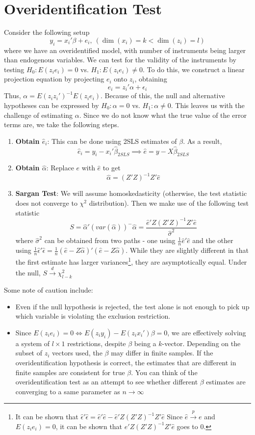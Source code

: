\section{Overidentification Test}
Consider the following setup
\[
y_i = x_i'\beta+e_i, \ (\dim(x_i)=k<\dim(z_i)=l) 
\]
where we have an overidentified model, with number of instruments being larger than endogenous variables. We can test for the validity of the instruments by testing $H_0: E(z_ie_i)=0$ vs. $H_1: E(z_ie_i)\neq0$. To do this, we construct a linear projection equation by projecting $e_i$ onto $z_i$, obtaining
\[
e_i=z_i'\alpha+\epsilon_i
\]
Thus, $\alpha=E(z_iz_i')^{-1}E(z_ie_i)$. Because of this, the null and alternative hypotheses can be expressed by $H_0: \alpha=0$ vs. $H_1: \alpha\neq0$. This leaves us with the challenge of estimating $\alpha$.  Since we do not know what the true value of the error terms are, we take the following steps.
\begin{enumerate}
\item \textbf{Obtain $\hat{e}_i$}: This can be done using 2SLS estimates of $\beta$. As a result, 
\[
\hat{e}_i = y_i-x_i'\hat{\beta}_{2SLS} \implies \hat{e}=y-X\hat{\beta}_{2SLS}
\]
\item \textbf{Obtain $\hat{\alpha}$}: Replace $e$ with $\hat{e}$ to get
\[
\hat{\alpha} = (Z'Z)^{-1}Z'\hat{e}
\]
\item \textbf{Sargan Test}: We will assume homoskedasticity (otherwise, the test statistic does not converge to $\chi^2$ distribution). Then we make use of the following test statistic
\[
S=\hat{\alpha}'(var(\hat{\alpha}))^{-}\hat{\alpha}=\frac{\hat{e}'Z(Z'Z)^{-1}Z'\hat{e}}{\hat{\sigma}^2}
\]
where $\hat{\sigma}^2$ can be obtained from two paths - one using $\frac{1}{n}\hat{e}'\hat{e}$ and the other using $\frac{1}{n}\hat{\epsilon}'\hat{\epsilon}=\frac{1}{n}(\hat{e}-Z\hat{\alpha})'(\hat{e}-Z\hat{\alpha})$. While they are slightly different in that the first estimate has larger variances\footnote{It can be shown that $\hat{\epsilon}'\hat{\epsilon}=\hat{e}'\hat{e}-\hat{e}'Z(Z'Z)^{-1}Z'\hat{e}$ Since $\hat{e}\xrightarrow{p}e$ and $E(z_ie_i)=0$, it can be shown that $\hat{e}'Z(Z'Z)^{-1}Z'\hat{e}$ goes to 0.}, they are asymptotically equal. Under the null, $S\xrightarrow{d}\chi_{l-k}^2$
\end{enumerate}
Some note of caution include:
\begin{itemize}
\item Even if the null hypothesis is rejected, the test alone is not enough to pick up which variable is violating the exclusion restriction.
\item Since $E(z_ie_i)=0\iff E(z_iy_i)-E(z_ix_i')\beta=0$, we are effectively solving a system of $l\times 1$ restrictions, despite $\beta$ being a $k$-vector. Depending on the subset of $z_i$ vectors used, the $\beta$ may differ in finite samples. If the overidentification hypothesis is correct, the estimates that are different in finite samples are consistent for true $\beta$. You can think of the overidentification test as an attempt to see whether different $\beta$ estimates are converging to a same parameter as $n\to\infty$ 
\end{itemize}
